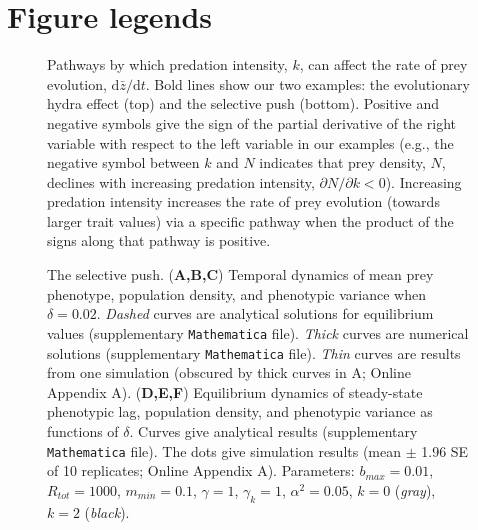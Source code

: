 \documentclass[11pt]{article}
\begin{document}
\newpage{}


\section*{Figure legends}

\begin{figure}[!h]
\centering
\caption{
Pathways by which predation intensity, $k$, can affect the rate of prey evolution, $\mathrm{d}\bar{z}/\mathrm{d}t$.
Bold lines show our two examples: the evolutionary hydra effect (top) and the selective push (bottom).
Positive and negative symbols give the sign of the partial derivative of the right variable with respect to the left variable in our examples (e.g., the negative symbol between $k$ and $N$ indicates that prey density, $N$, declines with increasing predation intensity, $\partial N/\partial k < 0$).
Increasing predation intensity increases the rate of prey evolution (towards larger trait values) via a specific pathway when the product of the signs along that pathway is positive.
}
\label{Diagram}
\end{figure}

\begin{figure}[!h]
\centering
\caption{
The selective push.
(\textbf{A,B,C}) Temporal dynamics of mean prey phenotype, population density, and phenotypic variance when $\delta = 0.02$.
\textit{Dashed} curves are analytical solutions for equilibrium values (supplementary \texttt{Mathematica} file). 
\textit{Thick} curves are numerical solutions (supplementary \texttt{Mathematica} file). 
\textit{Thin} curves are results from one simulation (obscured by thick curves in A; Online Appendix A). 
(\textbf{D,E,F}) Equilibrium dynamics of steady-state phenotypic lag, population density, and phenotypic variance as functions of $\delta$.
Curves give analytical results (supplementary \texttt{Mathematica} file). 
The dots give simulation results (mean $\pm$ 1.96 SE of 10 replicates; Online Appendix A).
Parameters: $b_{max}=0.01$, $R_{tot}=1000$, $m_{min}=0.1$, $\gamma=1$, $\gamma_k = 1$, $\alpha^2=0.05$, $k = 0$ (\textit{gray}), $k=2$ (\textit{black}).
}
\label{SelectivePush}
\end{figure}
\end{document}

